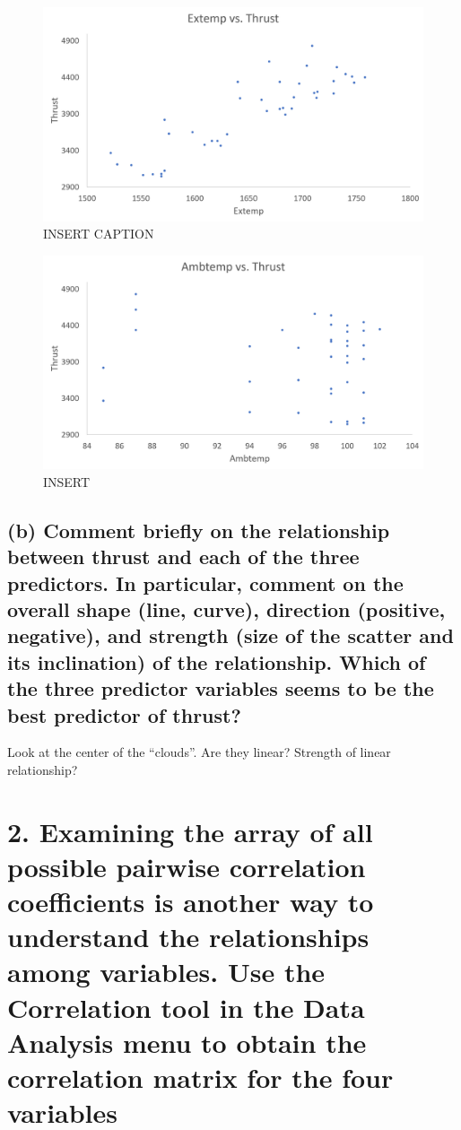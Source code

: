 \documentclass[letterpaper]{article}
\begin{document}
\begin{figure}[H]
 \centering
 \includegraphics[width=\textwidth]{extempthrust.png}
 \caption{INSERT CAPTION}
\end{figure}

\begin{figure}[H]
 \centering
 \includegraphics[width=\textwidth]{ambtempthrust.png}
 \caption{INSERT}
\end{figure}

\subsection{(b)	Comment briefly on the relationship between thrust and each of the three predictors. In particular, comment on the overall shape (line, curve), direction (positive, negative), and strength (size of the scatter and its inclination) of the relationship. Which of the three predictor variables seems to be the best predictor of thrust? }
Look at the center of the “clouds”.  Are they linear? Strength of
linear relationship?

\section{2.	Examining the array of all possible pairwise correlation coefficients is another way to understand the relationships among variables. Use the Correlation tool in the Data Analysis menu to obtain the correlation matrix for the four variables}
\end{document}
